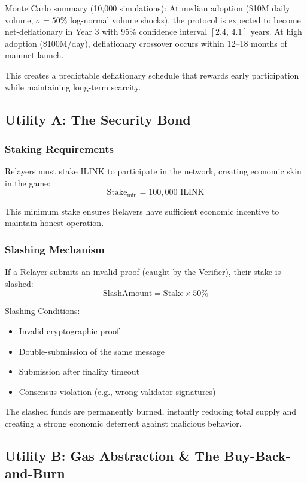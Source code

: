 \documentclass[11pt,a4paper]{article}
\begin{document}
Monte Carlo summary (10,000 simulations):
At median adoption (\$10M daily volume, $\sigma=50\%$ log-normal volume shocks),
the protocol is expected to become net-deflationary in Year 3 with 95\% confidence
interval $[2.4,\,4.1]$ years. At high adoption (\$100M/day), deflationary crossover occurs
within 12--18 months of mainnet launch.

This creates a predictable deflationary schedule that rewards early participation while maintaining long-term scarcity.

\subsection{Utility A: The Security Bond}

\subsubsection{Staking Requirements}
Relayers must stake ILINK to participate in the network, creating economic skin in the game:
$$ \text{Stake}_{\text{min}} = 100,000 \text{ ILINK} $$

This minimum stake ensures Relayers have sufficient economic incentive to maintain honest operation.

\subsubsection{Slashing Mechanism}
If a Relayer submits an invalid proof (caught by the Verifier), their stake is slashed:
$$ \text{SlashAmount} = \text{Stake} \times 50\% $$

Slashing Conditions:
\begin{itemize}
    \item Invalid cryptographic proof
    \item Double-submission of the same message
    \item Submission after finality timeout
    \item Consensus violation (e.g., wrong validator signatures)
\end{itemize}

The slashed funds are permanently burned, instantly reducing total supply and creating a strong economic deterrent against malicious behavior.

\subsection{Utility B: Gas Abstraction \& The Buy-Back-and-Burn}
\end{document}
